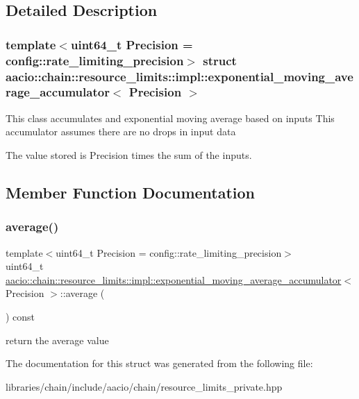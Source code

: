 \subsection{Detailed Description}
\subsubsection*{template$<$uint64\+\_\+t Precision = config\+::rate\+\_\+limiting\+\_\+precision$>$\newline
struct aacio\+::chain\+::resource\+\_\+limits\+::impl\+::exponential\+\_\+moving\+\_\+average\+\_\+accumulator$<$ Precision $>$}

This class accumulates and exponential moving average based on inputs This accumulator assumes there are no drops in input data

The value stored is Precision times the sum of the inputs. 

\subsection{Member Function Documentation}
\mbox{\label{structaacio_1_1chain_1_1resource__limits_1_1impl_1_1exponential__moving__average__accumulator_af26d1c17e57a3a4e6ab2d9dacc54d6ba}} 
\subsubsection{\texorpdfstring{average()}{average()}}
{\footnotesize\ttfamily template$<$uint64\+\_\+t Precision = config\+::rate\+\_\+limiting\+\_\+precision$>$ \\
uint64\+\_\+t \mbox{\hyperlink{structaacio_1_1chain_1_1resource__limits_1_1impl_1_1exponential__moving__average__accumulator}{aacio\+::chain\+::resource\+\_\+limits\+::impl\+::exponential\+\_\+moving\+\_\+average\+\_\+accumulator}}$<$ Precision $>$\+::average (\begin{DoxyParamCaption}{ }\end{DoxyParamCaption}) const\hspace{0.3cm}{\ttfamily [inline]}}

return the average value 

The documentation for this struct was generated from the following file\+:\begin{DoxyCompactItemize}
\item 
libraries/chain/include/aacio/chain/resource\+\_\+limits\+\_\+private.\+hpp\end{DoxyCompactItemize}
